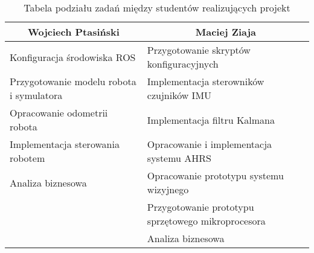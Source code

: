 \begin{table}[h]
\begin{tabular}{ll}
\toprule
\multicolumn{1}{c}{Wojciech Ptasiński}   & \multicolumn{1}{c}{Maciej Ziaja} \\
\midrule
Konfiguracja środowiska ROS              & Przygotowanie skryptów
                                           konfiguracyjnych \\
Przygotowanie modelu robota i symulatora & Implementacja sterowników czujników
                                           IMU \\
Opracowanie odometrii robota             & Implementacja filtru Kalmana \\
Implementacja sterowania robotem         & Opracowanie i implementacja systemu
                                           AHRS \\
Analiza biznesowa                        & Opracowanie prototypu systemu
                                           wizyjnego \\
                                         & Przygotowanie prototypu sprzętowego
                                           mikroprocesora \\
                                         & Analiza biznesowa \\
\bottomrule
\end{tabular}
\caption{Tabela podziału zadań między studentów realizujących projekt}
\label{tab:org}
\end{table}